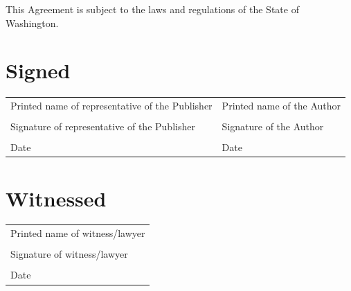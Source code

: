\documentclass[12pt,letterpaper]{article}
\begin{document}
This Agreement is subject to the laws and regulations of the State of Washington.

\newpage

\thispagestyle{final}

\section*{Signed}

\begin{tabular}{p{3in} | p{3in}}
    \vspace{0.5in} & \\ \hline
    Printed name of representative of the Publisher & Printed name of the Author \\
    \vspace{0.5in} & \\ \hline
    Signature of representative of the Publisher & Signature of the Author \\
    \vspace{0.5in} & \\ \hline
    Date & Date \\
\end{tabular}

\section*{Witnessed}

\begin{tabular}{l}
    \vspace{0.5in} \\ \hline
    Printed name of witness/lawyer \\
    \vspace{0.5in} \\ \hline
    Signature of witness/lawyer \\
    \vspace{0.5in} \\ \hline
    Date \\
\end{tabular}
\end{document}
